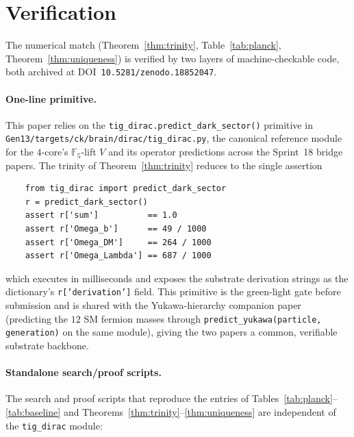 \documentclass[11pt,reqno]{amsart}
\theoremstyle{plain}
\theoremstyle{definition}
\theoremstyle{remark}
\newcommand{\F}{\mathbb{F}}
\begin{document}
\section{Verification}\label{sec:verify}

The numerical match (Theorem~\ref{thm:trinity}, Table~\ref{tab:planck},
Theorem~\ref{thm:uniqueness}) is verified by two layers of
machine-checkable code, both archived at
DOI~\texttt{10.5281/zenodo.18852047}.

\paragraph{One-line primitive.}
This paper relies on the
\texttt{tig\_dirac.predict\_dark\_sector()} primitive in
\texttt{Gen13/targets/ck/brain/dirac/tig\_dirac.py}, the canonical
reference module for the $4$-core's $\F_5$-lift $V$ and its
operator predictions across the Sprint~18 bridge papers. The
trinity of Theorem~\ref{thm:trinity} reduces to the single
assertion
\begin{verbatim}
    from tig_dirac import predict_dark_sector
    r = predict_dark_sector()
    assert r['sum']          == 1.0
    assert r['Omega_b']      == 49 / 1000
    assert r['Omega_DM']     == 264 / 1000
    assert r['Omega_Lambda'] == 687 / 1000
\end{verbatim}
which executes in milliseconds and exposes the substrate
derivation strings as the dictionary's
\texttt{r['derivation']} field. This primitive is the green-light
gate before submission and is shared with the Yukawa-hierarchy
companion paper~\cite{SandersJohnson2026Yukawa} (predicting the
$12$ SM fermion masses through
\texttt{predict\_yukawa(particle, generation)} on the same
module), giving the two papers a common, verifiable substrate
backbone.

\paragraph{Standalone search/proof scripts.}
The search and proof scripts that reproduce the entries of
Tables~\ref{tab:planck}--\ref{tab:baseline} and
Theorems~\ref{thm:trinity}--\ref{thm:uniqueness} are independent
of the \texttt{tig\_dirac} module:
\end{document}
